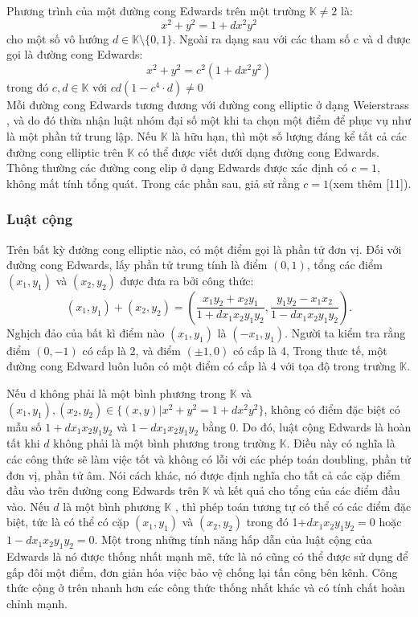 \documentclass[a4paper,12pt]{report}
\begin{document}
Phương trình của một đường cong Edwards trên một trường $\mathbb{K} \neq 2$ là:
\begin{displaymath}
x^{2}+y^{2}=1+dx^{2}y^{2}
\end{displaymath}
cho một số vô hướng  $d \in \mathbb{K} \setminus \{0,1\}$. Ngoài ra dạng sau với các tham số c và d được gọi là đường cong Edwards:
\begin{displaymath}
x^2 + y^2 = c^2(1 + dx^2y^2)
\end{displaymath}
trong đó $c, d \in \mathbb{K}$ với $cd(1 - c^4\cdot d) \neq 0$ \\
Mỗi đường cong Edwards tương đương với đường cong elliptic ở dạng Weierstrass , và do đó thừa nhận luật nhóm đại số một khi ta chọn một điểm để phục vụ như là một phần tử trung lập. Nếu $\mathbb{K}$ là hữu hạn, thì một số lượng đáng kể tất cả các đường cong elliptic trên $\mathbb{K}$ có thể được viết dưới dạng đường cong Edwards. Thông thường các đường cong elip ở dạng Edwards được xác định có $c = 1$, không mất tính tổng quát. Trong các phần sau, giả sử rằng $c = 1$(xem thêm [11]).
\subsubsection{Luật cộng}
Trên bất kỳ đường cong elliptic nào, có một điểm gọi là phần tử đơn vị. Đối với đường cong Edwards, lấy phần tử trung tính là điểm $(0, 1)$, tổng các điểm $(x_1,  y_1)$ và $(x_2 ,y_2)$ được đưa ra bởi công thức:
\begin{displaymath}
(x_1, y_1) + (x_2, y_2) = \left( \frac{x_1y_2 + x_2y_1}{1 + dx_1x_2y_1y_2}, \frac{y_1y_2 - x_1x_2}{1 - dx_1x_2y_1y_2} \right).
\end{displaymath}
Nghịch đảo của bất kì điểm nào $(x_1, y_1)$ là $(-x_1, y_1)$. Người ta kiểm tra rằng điểm $(0, -1)$ có cấp là 2, và điểm $(\pm 1, 0)$ có cấp là 4, Trong thưc tế, một đường cong Edward luôn luôn có một điểm có cấp là 4 với tọa độ trong trường $\mathbb{K}$.

Nếu d không phải là một bình phương trong $\mathbb{K}$ và $\displaystyle (x_{1}, y_{1}), (x_{2}, y_{2}) \in \{(x, y)|x^{2} + y^{2} = 1 + dx^{2}y^{2} \}$, không có điểm đặc biệt có mẫu số $1 +  dx_1x_2y_1y_2$ và $1 -  dx_1 x_2y_1y_2$ bằng 0. Do đó, luật cộng Edwards là hoàn tất khi $d$ không phải là một bình phương trong trường $\mathbb{K}$. Điều này có nghĩa là các công thức sẽ làm việc tốt và không có lỗi với các phép toán doubling, phần tử đơn vị, phần tử âm. Nói cách khác, nó được định nghĩa cho tất cả các cặp điểm đầu vào trên đường cong Edwards trên $\mathbb{K}$ và kết quả cho tổng của các điểm đầu vào.
Nếu $d$ là một bình phương $\mathbb{K}$ , thì phép toán tương tự có thể có các điểm đặc biệt, tức là có thể có cặp $(x_1, y_1)$ và $(x_2, y_2)$ trong đó 1$ +  dx_1x_2y_1y_2 = 0$ hoặc $1 -  dx_1x_2y_1y_2 = 0$.
Một trong những tính năng hấp dẫn của luật cộng của Edwards là nó được thống nhất mạnh mẽ, tức là nó cũng có thể được sử dụng để gấp đôi một điểm, đơn giản hóa việc bảo vệ chống lại tấn công bên kênh. Công thức cộng ở trên nhanh hơn các công thức thống nhất khác và có tính chất hoàn chỉnh mạnh.
\end{document}
